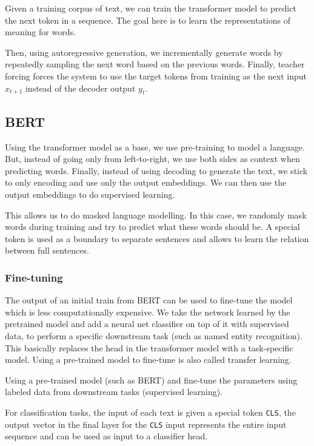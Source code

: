 Given a training corpus of text, we can train the transformer model
to predict the next token in a sequence. The goal here is to learn the
representations of meaning for words.

Then, using autoregressive generation, we incrementally generate words
by repeatedly sampling the next word based on the previous words. Finally,
teacher forcing forces the system to use the target tokens from training
as the next input $x_{t+1}$ instead of the decoder output $y_t$.

\subsection{BERT}

Using the transformer model as a base, we use pre-training to model a
language. But, instead of going only from left-to-right, we use both sides
as context when predicting words. Finally, instead of using decoding to
generate the text, we stick to only encoding and use only the output embeddings.
We can then use the output embeddings to do supervised learning.

This allows us to do masked language modelling. In this case, we randomly mask
words during training and try to predict what these words should be. A special
token is used as a boundary to separate sentences and allows to learn
the relation
between full sentences.

\subsubsection{Fine-tuning}

The output of an initial train from BERT can be used to fine-tune the
model which
is less computationally expensive. We take the network learned by the
pretrained model
and add a neural net classifier on top of it with supervised data, to
perform a specific
downstream task (such as named entity recognition). This basically
replaces the head
in the transformer model with a task-specific model. Using a
pre-trained model to
fine-tune is also called transfer learning.

\begin{definition}
  Using a pre-trained model (such as BERT) and fine-tune the
  parameters using labeled
  data from downstream tasks (supervised learning).
\end{definition}

For classification tasks, the input of each text is given a special
token \texttt{CLS},
the output vector in the final layer for the \texttt{CLS} input
represents the entire input
sequence and can be used as input to a classifier head.

